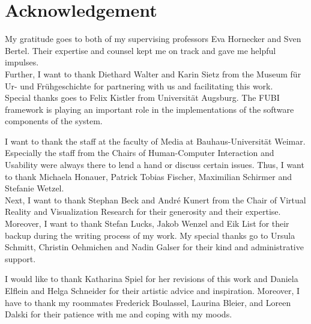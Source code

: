 \chapter*{Acknowledgement}

My gratitude goes to both of my supervising professors Eva Hornecker and Sven Bertel. Their expertise and counsel kept me on track and gave me helpful impulses. 
\\
Further, I want to thank Diethard Walter and Karin Sietz from the Museum für Ur- und Frühgeschichte for partnering with us and facilitating this work. 
\\
Special thanks goes to Felix Kistler from Universität Augsburg. The FUBI framework is playing an important role in the implementations of the software components of the system. 

I want to thank the staff at the faculty of Media at Bauhaus-Universität Weimar. Especially the staff from the Chairs of Human-Computer Interaction and Usability were always there to lend a hand or discuss certain issues. Thus, I want to thank Michaela Honauer, Patrick Tobias Fischer, Maximilian Schirmer and Stefanie Wetzel.
\\
Next, I want to thank Stephan Beck and André Kunert from the Chair of Virtual Reality and Visualization Research for their generosity and their expertise. Moreover, I want to thank Stefan Lucks, Jakob Wenzel and Eik List for their backup during the writing process of my work. My special thanks go to Ursula Schmitt, Christin Oehmichen and Nadin Galser for their kind and administrative support.

I would like to thank Katharina Spiel for her revisions of this work and Daniela Elflein and Helga Schneider for their artistic advice and inspiration. Moreover, I have to thank my roommates Frederick Boulassel, Laurina Bleier, and Loreen Dalski for their patience with me and coping with my moods.




